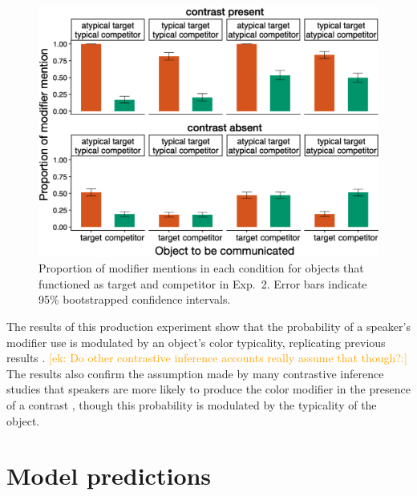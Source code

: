 \documentclass[a4paper,man,floatsintext,natbib]{apa6}
\newcommand{\ek}[1]{\textcolor{Orange}{[ek: #1]}}
\begin{document}
\begin{figure}[H]
	\begin{center}
		\includegraphics[width=.8\textwidth]{img/production/prod-bycond-paper.pdf}
	\end{center}
\caption{Proportion of modifier mentions in each condition for objects that functioned as target and competitor in Exp.~2. Error bars indicate 95\% bootstrapped confidence intervals.} 
\label{prod-results}
\end{figure}

The results of this production experiment show that the probability of a speaker's modifier use is modulated by an object's color typicality, replicating previous results \cite{Westerbeek:2015}. 
\ek{Do other contrastive inference accounts really assume that though?:} The results also confirm the assumption made by many contrastive inference studies that speakers are more likely to produce the color modifier in the presence of a contrast \cite{Aparicio:2018,Grodner:2011,Sedivy:1999}, though this probability is modulated by the typicality of the object.

\section{Model predictions}
\end{document}
